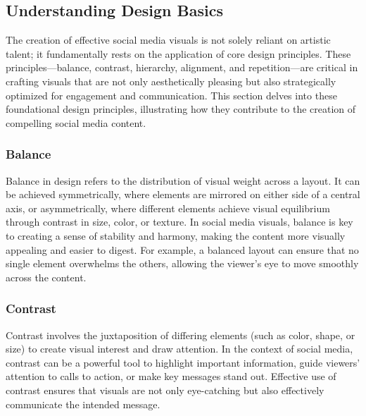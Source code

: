 \documentclass[
]{book}
\begin{document}
\hypertarget{understanding-design-basics}{%
\subsection*{Understanding Design Basics}\label{understanding-design-basics}}

The creation of effective social media visuals is not solely reliant on artistic talent; it fundamentally rests on the application of core design principles. These principles---balance, contrast, hierarchy, alignment, and repetition---are critical in crafting visuals that are not only aesthetically pleasing but also strategically optimized for engagement and communication. This section delves into these foundational design principles, illustrating how they contribute to the creation of compelling social media content.

\hypertarget{balance}{%
\subsubsection*{Balance}\label{balance}}

Balance in design refers to the distribution of visual weight across a layout. It can be achieved symmetrically, where elements are mirrored on either side of a central axis, or asymmetrically, where different elements achieve visual equilibrium through contrast in size, color, or texture. In social media visuals, balance is key to creating a sense of stability and harmony, making the content more visually appealing and easier to digest. For example, a balanced layout can ensure that no single element overwhelms the others, allowing the viewer's eye to move smoothly across the content.

\hypertarget{contrast}{%
\subsubsection*{Contrast}\label{contrast}}

Contrast involves the juxtaposition of differing elements (such as color, shape, or size) to create visual interest and draw attention. In the context of social media, contrast can be a powerful tool to highlight important information, guide viewers' attention to calls to action, or make key messages stand out. Effective use of contrast ensures that visuals are not only eye-catching but also effectively communicate the intended message.
\end{document}
